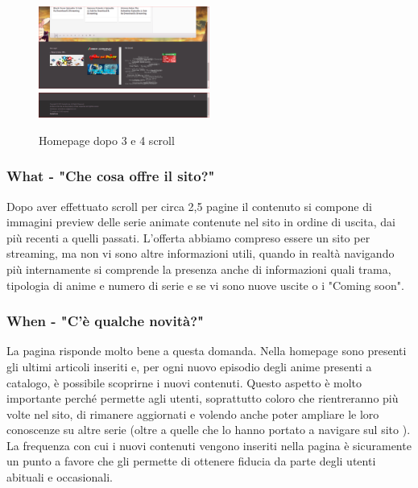 \begin{figure}[H]
	\includegraphics[width=0.5\textwidth]{img/hp04.png}
	\includegraphics[width=0.5\textwidth]{img/hp05.png}
	\caption{Homepage dopo 3 e 4 scroll} 
	\label{img3} 
\end{figure}

\subsubsection{What - "Che cosa offre il sito?"} \label{HWhat}
Dopo aver effettuato scroll per circa 2,5 pagine il contenuto si compone di immagini preview delle serie animate contenute nel sito in ordine di uscita, dai più recenti a quelli passati. L'offerta abbiamo compreso essere un sito per streaming, ma non vi sono altre informazioni utili, quando in realtà navigando più internamente si comprende la presenza anche di informazioni quali trama, tipologia di anime e numero di serie e se vi sono nuove uscite o i "Coming soon".

\subsubsection{When - "C'è qualche novità?"} \label{HWhen}
La pagina risponde molto bene a questa domanda. Nella homepage sono presenti gli ultimi articoli inseriti e, per ogni nuovo episodio degli anime presenti a catalogo, è possibile scoprirne i nuovi contenuti.
Questo aspetto è molto importante perché permette agli utenti, soprattutto coloro che rientreranno più volte nel sito, di rimanere aggiornati e volendo anche poter ampliare le loro conoscenze su altre serie (oltre a quelle che lo hanno portato a navigare sul sito \nomeSito). La frequenza con cui i nuovi contenuti vengono inseriti nella pagina è sicuramente un punto a favore che gli permette di ottenere fiducia da parte degli utenti abituali e occasionali.

